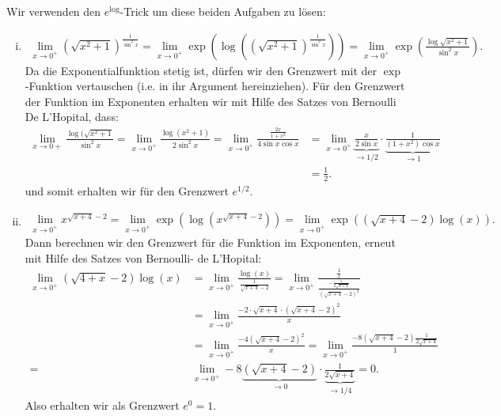 \documentclass[a4paper, 20]{exam}
\begin{document}
\begin{solution} Wir verwenden den $e^{\log}$-Trick um diese beiden Aufgaben zu lösen: 
\begin{enumerate}[i)] 
\item 
\begin{align*}
 \lim_{x \rightarrow 0^+} \left( \sqrt{x^2 +1} \right)^{ \frac{1}{\sin^2 x}} = \lim_{ x \rightarrow 0^+} \exp \left( \log \left( ( \sqrt{x^2+1})^\frac{1}{\sin^2x} \right) \right) = \lim_{x \rightarrow 0^+} \exp \left( \frac{\log \sqrt{x^2+1}}{\sin^2 x} \right). 
\end{align*}
Da die Exponentialfunktion stetig ist, dürfen wir den Grenzwert mit der $\exp$-Funktion vertauschen (i.e. in ihr Argument hereinziehen). Für den Grenzwert der Funktion im Exponenten erhalten wir mit Hilfe des Satzes von Bernoulli De L'Hopital, dass:
\begin{align*}
\lim_{x \rightarrow 0+} \frac{\log ( \sqrt{x^2+1}}{\sin^2x} = \lim_{x \rightarrow 0^+} \frac{\log(x^2+1)}{2 \sin^2 x} = \lim_{x \rightarrow 0^+} \frac{\frac{2x}{1+x^2}}{4 \sin x \cos x} &= \lim_{x \rightarrow 0^+} \underbrace{\frac{x}{2 \sin x}}_{ \longrightarrow 1/2} \cdot \underbrace{\frac{1}{(1+x^2) \cos x}}_{ \longrightarrow 1}   
\\ & = \frac{1}{2}.
\end{align*}
und somit erhalten wir für den Grenzwert $e^{1/2}$. 

\item 
\begin{align*}
\lim_{x \rightarrow 0^+} x^{ \sqrt{x+4}-2} = \lim_{x \rightarrow 0^+} \exp \left( \log \left( x^{ \sqrt{x+4}-2} \right) \right) = \lim_{x \rightarrow 0^+} \exp \left( (\sqrt{x+4}-2) \log(x) \right). 
\end{align*}
Dann berechnen wir den Grenzwert für die Funktion im Exponenten, erneut mit Hilfe des Satzes von Bernoulli- de L'Hopital:
\begin{align*}
\lim_{ x \rightarrow 0^+} ( \sqrt{4+x}-2) \log(x) & = \lim_{x \rightarrow 0^+} \frac{\log (x)}{\frac{1}{\sqrt{x+4}-2}} = \lim_{x \rightarrow 0^+} \frac{\frac{1}{x}}{\frac{- \frac{1}{2 \sqrt{x+4}}}{(\sqrt{x+4}-2)^2}} \\
&= \lim_{x \rightarrow 0^+} \frac{-2 \cdot \sqrt{x+4} \cdot ( \sqrt{x+4}-2)^2}{x} \\
&=  \lim_{x \rightarrow 0^+} \frac{-4 ( \sqrt{x+4}-2)^2}{x} = \lim_{x \rightarrow 0^+} \frac{-8( \sqrt{x+4}-2) \frac{1}{2 \sqrt{x+4}}}{1} \\
= & \lim_{x \rightarrow 0^+} -8 \underbrace{( \sqrt{x+4}-2)}_{ \longrightarrow 0} \cdot \underbrace{\frac{1}{2 \sqrt{x+4}}}_{ \longrightarrow 1/4}  = 0 .
\end{align*}
Also erhalten wir als Grenzwert $e^0=1$. 
\end{enumerate}
\end{solution}
\end{document}

